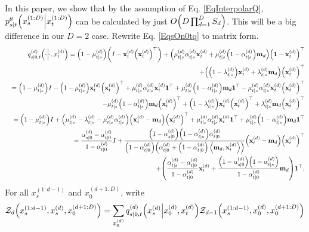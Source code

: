\documentclass[10pt]{article}
\begin{document}
In this paper, we show that by the assumption of Eq. \eqref{EqInterpolarQ}, $p^\theta_{s|t}\qty(x_s^{(1:D)}\middle|x_t^{(1:D)})$ can be calculated by just $O\qty(D\prod_{d=1}^D S_d)$. This will be a big difference in our $D=2$ case. Rewrite Eq. \eqref{EqsOn0tq} to matrix form.
\begin{eqnarray*}
  &&q^{(d)}_{s|0,t}\qty(\cdot\middle|\cdot,x^{(d)}_t)=\qty(1-\mu^{(d)}_{t|s})\qty(I - \mathbf{x}^{(d)}_t\qty(\mathbf{x}^{(d)}_t)^\top) + \qty(\mu^{(d)}_{t|s}\alpha^{(d)}_{t|s}\mathbf{x}^{(d)}_t + \mu^{(d)}_{t|s}\qty(1-\alpha^{(d)}_{t|s})\mathbf{m}_d)\qty(\mathbf{1}-\mathbf{x}^{(d)}_t)^\top\\
  &&+ \qty(\qty(1-\lambda^{(d)}_{t|s})\mathbf{x}^{(d)}_t + \lambda^{(d)}_{t|s}\mathbf{m}_d)\qty(\mathbf{x}^{(d)}_t)^\top\\
  &&=\qty(1-\mu^{(d)}_{t|s}) I - \qty(1-\mu^{(d)}_{t|s})\mathbf{x}^{(d)}_t\qty(\mathbf{x}^{(d)}_t)^\top + \mu^{(d)}_{t|s}\alpha^{(d)}_{t|s}\mathbf{x}^{(d)}_t\mathbf{1}^\top + \mu^{(d)}_{t|s}\qty(1-\alpha^{(d)}_{t|s})\mathbf{m}_d\mathbf{1}^\top - \mu^{(d)}_{t|s}\alpha^{(d)}_{t|s}\mathbf{x}^{(d)}_t\qty(\mathbf{x}^{(d)}_t)^\top\\
  && - \mu^{(d)}_{t|s}\qty(1-\alpha^{(d)}_{t|s})\mathbf{m}_d\qty(\mathbf{x}^{(d)}_t)^\top + \qty(1-\lambda^{(d)}_{t|s})\mathbf{x}^{(d)}_t\qty(\mathbf{x}^{(d)}_t)^\top + \lambda^{(d)}_{t|s}\mathbf{m}_d\qty(\mathbf{x}^{(d)}_t)^\top\\
  &&=\qty(1-\mu^{(d)}_{t|s}) I + \qty(\mu^{(d)}_{t|s} - \lambda^{(d)}_{t|s} - \mu^{(d)}_{t|s}\alpha^{(d)}_{t|s})\qty(\mathbf{x}^{(d)}_t - \mathbf{m}_d)\qty(\mathbf{x}^{(d)}_t)^\top + \mu^{(d)}_{t|s}\alpha^{(d)}_{t|s}\mathbf{x}^{(d)}_t\mathbf{1}^\top + \mu^{(d)}_{t|s}\qty(1-\alpha^{(d)}_{t|s})\mathbf{m}_d\mathbf{1}^\top\\
  &&=\frac{\alpha^{(d)}_{s|0}-\alpha^{(d)}_{t|0}}{1-\alpha^{(d)}_{t|0}} I + \frac{\qty(1-\alpha^{(d)}_{s|0})\qty(1-\alpha^{(d)}_{t|s})\alpha^{(d)}_{t|0}}{\qty(1-\alpha^{(d)}_{t|0})\qty(\alpha^{(d)}_{t|0}+\qty(1-\alpha^{(d)}_{t|0})\left\langle\mathbf{m}_d, \mathbf{x}^{(d)}_t\right\rangle)}\qty(\mathbf{x}^{(d)}_t - \mathbf{m}_d)\qty(\mathbf{x}^{(d)}_t)^\top\\
  && + \qty(\frac{\alpha^{(d)}_{t|s}-\alpha^{(d)}_{t|0}}{1-\alpha^{(d)}_{t|0}}\mathbf{x}^{(d)}_t + \frac{\qty(1-\alpha^{(d)}_{s|0})\qty(1-\alpha^{(d)}_{t|s})}{1-\alpha^{(d)}_{t|0}}\mathbf{m}_d)\mathbf{1}^\top.
\end{eqnarray*}
For all $x_s^{(1:d-1)}$ and $x_0^{(d+1:D)}$, write
\begin{eqnarray*}
  \mathcal{Z}_d\qty(x^{(1:d-1)}_s, x^{(d)}_s, x^{(d+1:D)}_0)=\sum_{x^{(d)}_0}q_{s|0,t}^{(d)}\qty(x_s^{(d)}\middle|x_0^{(d)}, x_t^{(d)})\mathcal{Z}_{d-1}\qty(x_s^{(1:d-1)},x_0^{(d)},x_0^{(d+1:D)})
\end{eqnarray*}
\end{document}
